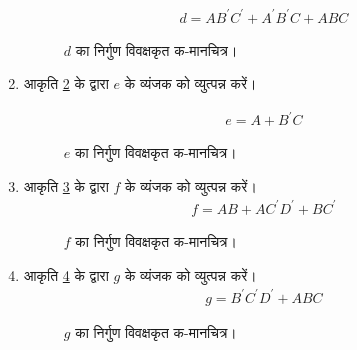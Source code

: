 \begin{enumerate}[label=\thesubsection.\arabic*.,ref=\thesubsection.\theenumi]
\begin{align}
\label{eq:kmapX_disp_d}
d=AB^{\prime}C^{\prime}+A^{\prime}B^{\prime}C+ABC
\end{align}
%
\begin{figure}[!ht]
\centering
\resizebox{\columnwidth}{!} {

}
\caption{$d$ का निर्गुण  विवक्षकृत क-मानचित्र।}
\label{fig:disp_kmapX_d}
\end{figure}
\item आकृति \ref{fig:disp_kmapX_e} के द्वारा $e$ के व्यंजक को व्युत्पन्न करें।
%

\begin{align}
\label{eq:kmapX_disp_e}
e=A+B^{\prime}C
\end{align}
%
\begin{figure}[!ht]
\centering
\resizebox{\columnwidth}{!} {

}
\caption{$e$ का निर्गुण  विवक्षकृत क-मानचित्र।}
\label{fig:disp_kmapX_e}
\end{figure}
%
\item आकृति \ref{fig:disp_kmapX_f} के द्वारा $f$ के व्यंजक को व्युत्पन्न करें।
%
\begin{align}
\label{eq:kmapX_disp_f}
f= AB + AC^{\prime}D^{\prime} + BC^{\prime}
\end{align}
%
\begin{figure}[!ht]
\centering
\resizebox{\columnwidth}{!} {

}
\caption{$f$ का निर्गुण  विवक्षकृत क-मानचित्र।}
\label{fig:disp_kmapX_f}
\end{figure}

%
\item आकृति \ref{fig:disp_kmapX_g} के द्वारा $g$ के व्यंजक को व्युत्पन्न करें।
%
\begin{align}
\label{eq:kmapX_disp_g}
g = B^{\prime}C^{\prime}D^{\prime}+ABC
\end{align}
%
\begin{figure}[!ht]
\centering
\resizebox{\columnwidth}{!} {

}
\caption{$g$ का निर्गुण  विवक्षकृत क-मानचित्र।}
\label{fig:disp_kmapX_g}
\end{figure}
\end{enumerate}
%
%
